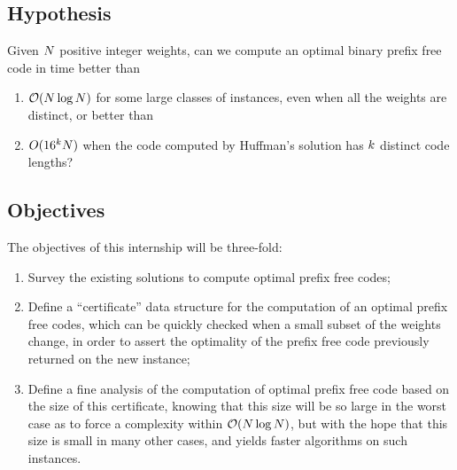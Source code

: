 \documentclass{llncs}
\providecommand{\Oh}{\ensuremath{{\cal O}}}
\providecommand{\nbWeights}{{\ensuremath N}}
\providecommand{\nbCodeLengths}{{\ensuremath k}}
\begin{document}
\subsection*{Hypothesis}
\label{sec:hypothesis}
Given $\nbWeights$ positive integer weights, can we compute an optimal binary prefix free code in time better than
\begin{enumerate}
\item  $\Oh(\nbWeights\log\nbWeights)$ for some large classes of instances, even when all the weights are distinct, or better than
\item $O(16^\nbCodeLengths\nbWeights)$ when the code computed by Huffman's solution has $\nbCodeLengths$ distinct code lengths?
\end{enumerate}

\subsection*{Objectives}
The objectives of this internship will be three-fold:
\begin{enumerate}
\item Survey the existing solutions to compute optimal prefix free codes;
\item Define a ``certificate'' data structure for the computation of an optimal prefix free codes, which can be quickly checked when a small subset of the weights change, in order to assert the optimality of the prefix free code previously returned on the new instance;
\item Define a fine analysis of the computation of optimal prefix free code based on the size of this certificate, knowing that this size will be so large in the worst case as to force a complexity within $\Oh(\nbWeights\log\nbWeights)$, but with the hope that this size is small in many other cases, and yields faster algorithms on such instances.
\end{enumerate}







\end{document}
